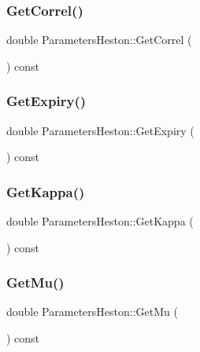 \subsubsection{\texorpdfstring{Get\+Correl()}{GetCorrel()}}
{\footnotesize\ttfamily double Parameters\+Heston\+::\+Get\+Correl (\begin{DoxyParamCaption}{ }\end{DoxyParamCaption}) const\hspace{0.3cm}{\ttfamily [inline]}}

\hypertarget{classParametersHeston_a76212feaa625ee28ad2be65fb6f0c8ec}{}\label{classParametersHeston_a76212feaa625ee28ad2be65fb6f0c8ec} 
\subsubsection{\texorpdfstring{Get\+Expiry()}{GetExpiry()}}
{\footnotesize\ttfamily double Parameters\+Heston\+::\+Get\+Expiry (\begin{DoxyParamCaption}{ }\end{DoxyParamCaption}) const\hspace{0.3cm}{\ttfamily [inline]}}

\hypertarget{classParametersHeston_acea97934c0971b431042f5c668f2c5fa}{}\label{classParametersHeston_acea97934c0971b431042f5c668f2c5fa} 
\subsubsection{\texorpdfstring{Get\+Kappa()}{GetKappa()}}
{\footnotesize\ttfamily double Parameters\+Heston\+::\+Get\+Kappa (\begin{DoxyParamCaption}{ }\end{DoxyParamCaption}) const\hspace{0.3cm}{\ttfamily [inline]}}

\hypertarget{classParametersHeston_ae0c438d9defb44345c803fcf567e1efc}{}\label{classParametersHeston_ae0c438d9defb44345c803fcf567e1efc} 
\subsubsection{\texorpdfstring{Get\+Mu()}{GetMu()}}
{\footnotesize\ttfamily double Parameters\+Heston\+::\+Get\+Mu (\begin{DoxyParamCaption}{ }\end{DoxyParamCaption}) const\hspace{0.3cm}{\ttfamily [inline]}}

